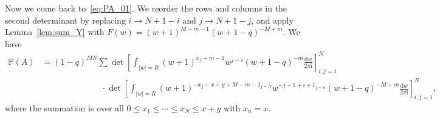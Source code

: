 \documentclass{article}
\numberwithin{equation}{section}
\newcommand{\ddbar}[2]{\frac{{\mathrm d}#1}{2\pi {\mathrm i}#2}}
\newcommand{\prob}{\mathbb{P}}
\begin{document}
\bigskip
Now we come back to~\eqref{eq:PA_01}. We reorder the rows and columns in the second determinant by replacing $i\to N+1-i$ and $j\to N+1-j$, and apply Lemma~\ref{lem:sum_Y} with $F(w) = (w+1)^{M-m-1}(w+1-q)^{-M+m}$. We have
\begin{equation}
	\label{eq:PA_02}
	\begin{split}
		\prob(A)
		&= (1-q)^{MN} \sum   \det 
		\left[
		\int_{|w|=R}
		(w+1)^{x_j+m-1}w^{j-i}(w+1-q)^{-m}\ddbar{w}{}
		\right]_{i,j=1}^N\\
		&\qquad\qquad\qquad \quad \cdot
		 \det\left[
	           \int_{|w|=R}
		          (w+1)^{-x_j+x+y+M-m-1_{j=N}}w^{-j-1+i+1_{j=n}}(w+1-q)^{-M+m}
		       \ddbar{w}{}
		     \right]_{i,j=1}^N,
	\end{split}
\end{equation}
where the summation is over all $0\le x_1\le\cdots\le x_N\le x+y$ with $x_n=x$.
\bigskip
\end{document}
